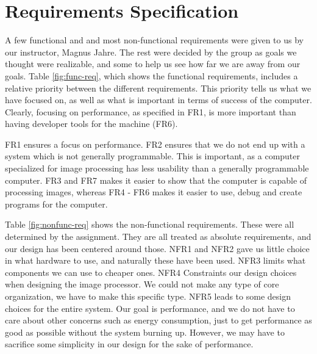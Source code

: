 \section{Requirements Specification}

 A few functional
and and most non-functional requirements were given to us by our instructor, Magnus
Jahre. The rest were decided by the group as goals we thought were realizable, and
some to help us see how far we are away from our goals. Table
\ref{fig:func-req}, which shows the functional requirements, includes a relative
priority between the different requirements.  This priority tells us what we
have focused on, as well as what is important in terms of success of the
computer. Clearly, focusing on performance, as specified in {\sc FR1}, is more
important than having developer tools for the machine ({\sc FR6}).

{\sc FR1} ensures a focus on performance. {\sc FR2} ensures that we do not end
up with a system which is not generally programmable. This is important, as a
computer specialized for image processing has less usability than a generally
programmable computer. {\sc FR3} and {\sc FR7} makes it easier to show that the
computer is capable of processing images, whereas {\sc FR4 - FR6} makes it
easier to use, debug and create programs for the computer.



Table \ref{fig:nonfunc-req} shows the non-functional requirements. These were
all determined by the assignment. They are all treated as absolute requirements,
and our design has been centered around those. {\sc NFR1} and {\sc NFR2} gave us
little choice in what hardware to use, and naturally these have been used. {\sc
  NFR3} limits what components we can use to cheaper ones. {\sc NFR4} Constraints our
design choices when designing the image processor. We could not make any type of core
organization, we have to make this specific type. {\sc NFR5} leads to some
design choices for the entire system. Our goal is performance, and we do not
have to care about other concerns such as energy consumption, just to
get performance as good as possible without the system
burning up. However, we may have to sacrifice some simplicity in our design for
the sake of performance.
